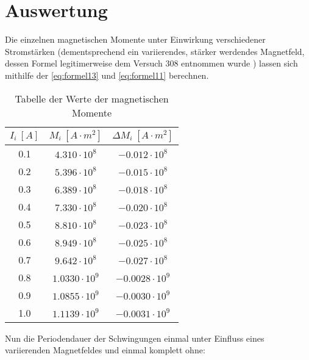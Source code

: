 \section{Auswertung}
\label{sec:Auswertung}

Die einzelnen magnetischen Momente unter Einwirkung verschiedener Stromstärken (dementsprechend ein variierendes, stärker werdendes Magnetfeld, dessen Formel legitimerweise dem Versuch 308 entnommen wurde \cite{v308}) lassen sich mithilfe der \autoref{eq:formel13} und \autoref{eq:formel11} berechnen.

\begin{table}[htp]
  \centering
  \caption{Tabelle der Werte der magnetischen Momente}
  \label{tab:tabc}
  \begin{tabular}{c c c}
      \toprule
      $ I_i \ [A] $ & $ M_i \ [A\cdot m^2]$ & $\Delta M_i \ [A\cdot m^2]$\\
      \midrule
      0.1 & $4.310 \cdot 10^8 $ & $-0.012 \cdot 10^8 $\\
      0.2 & $5.396 \cdot 10^8 $ & $-0.015 \cdot 10^8 $\\
      0.3 & $6.389 \cdot 10^8 $ & $-0.018 \cdot 10^8 $\\
      0.4 & $7.330 \cdot 10^8 $ & $-0.020 \cdot 10^8 $\\
      0.5 & $8.810 \cdot 10^8 $ & $-0.023 \cdot 10^8 $\\
      0.6 & $8.949 \cdot 10^8 $ & $-0.025 \cdot 10^8 $\\
      0.7 & $9.642 \cdot 10^8 $ & $-0.027 \cdot 10^8 $\\
      0.8 & $1.0330 \cdot 10^9 $ & $-0.0028 \cdot 10^9 $\\
      0.9 & $1.0855 \cdot 10^9 $ & $-0.0030 \cdot 10^9 $\\
      1.0 & $1.1139 \cdot 10^9 $ & $-0.0031 \cdot 10^9 $\\
      \bottomrule
  \end{tabular}
\end{table}

Nun die Periodendauer der Schwingungen einmal unter Einfluss eines variierenden Magnetfeldes und einmal komplett ohne:

